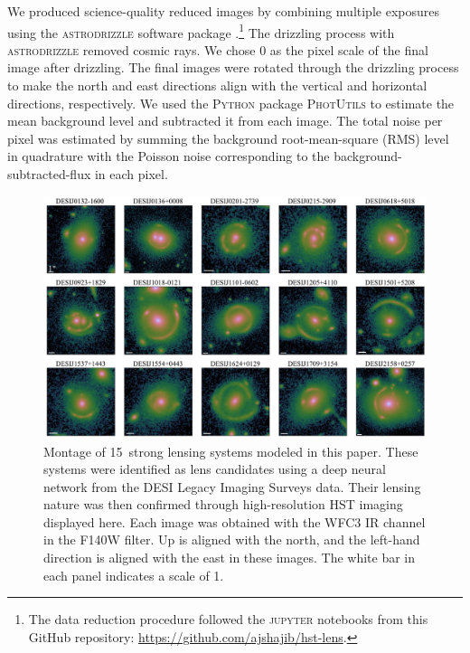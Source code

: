 \documentclass{aa}
\newcommand{\nlens}{15}
\newcommand{\newedit}[1]{{#1}} %
\begin{document}

We produced science-quality reduced images by combining multiple exposures using the \textsc{astrodrizzle} software package \citep{Avila15}.\footnote{The data reduction procedure followed the \textsc{jupyter} notebooks from this GitHub repository: \url{https://github.com/ajshajib/hst-lens}.} The drizzling process with \textsc{astrodrizzle} removed cosmic rays. We chose 0 as the pixel scale of the final image after drizzling. %
The final images were rotated through the drizzling process to make the north and east directions align with the vertical and horizontal directions, respectively. We used the \textsc{Python} package \textsc{PhotUtils} to estimate the mean background level and subtracted it from each image. The total noise per pixel was estimated by summing the background root-mean-square (RMS) level in quadrature with the Poisson noise corresponding to the background-subtracted-flux in each pixel.




\begin{figure}
	\includegraphics[width=\textwidth]{figures/lens_montage.pdf}
	\caption{\label{fig:montage}
Montage of \nlens\ strong lensing systems modeled in this paper. These systems were identified as lens candidates using a deep neural network from the DESI Legacy Imaging Surveys data. Their lensing nature was then confirmed through high-resolution HST imaging displayed here. Each image was obtained with the WFC3 IR channel in the F140W filter. Up is aligned with the \newedit{north}, and the left-hand direction is aligned with the east in these images. The white bar in each panel indicates a scale of 1\arcsec.}
\end{figure}
\end{document}

